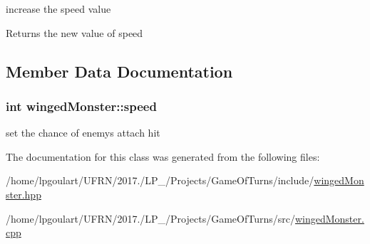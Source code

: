 increase the speed value 

\begin{DoxyReturn}{Returns}
the new value of speed 
\end{DoxyReturn}


\subsection{Member Data Documentation}
\subsubsection[{\texorpdfstring{speed}{speed}}]{\setlength{\rightskip}{0pt plus 5cm}int winged\+Monster\+::speed\hspace{0.3cm}{\ttfamily [private]}}\hypertarget{classwingedMonster_add58e2ea67dc81c40d2194b4f6f152a4}{}\label{classwingedMonster_add58e2ea67dc81c40d2194b4f6f152a4}


set the chance of enemy\textquotesingle{}s attach hit 



The documentation for this class was generated from the following files\+:\begin{DoxyCompactItemize}
\item 
/home/lpgoulart/\+U\+F\+R\+N/2017./\+L\+P\+\_/\+Projects/\+Game\+Of\+Turns/include/\hyperlink{wingedMonster_8hpp}{winged\+Monster.\+hpp}\item 
/home/lpgoulart/\+U\+F\+R\+N/2017./\+L\+P\+\_/\+Projects/\+Game\+Of\+Turns/src/\hyperlink{wingedMonster_8cpp}{winged\+Monster.\+cpp}\end{DoxyCompactItemize}
